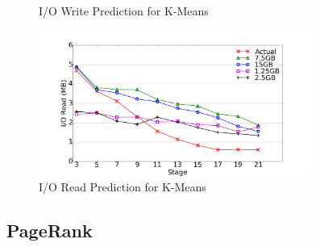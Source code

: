 {\begin{figure}[!t]
\caption{I/O Write Prediction for K-Means}
\label{km_io_w}
\end{figure}
\begin{figure}[!t]
\centering
\includegraphics[width=3.5in]{figures/km_io_r.png}
\caption{I/O Read Prediction for K-Means}
\label{km_io_r}
\end{figure}



\subsection{PageRank}

}
